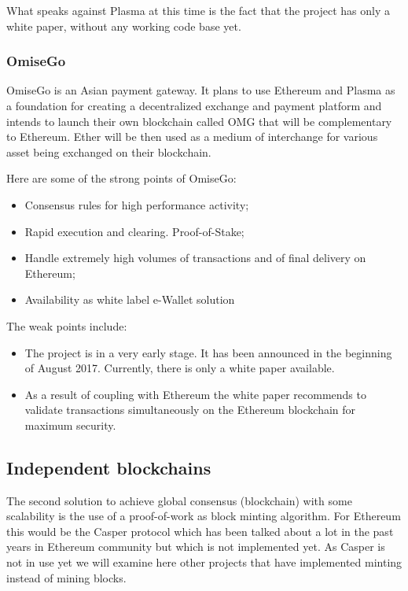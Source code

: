 What speaks against Plasma at this time is the fact that the project has only a white paper, without any working code base yet.

\subsubsection{OmiseGo}
OmiseGo is an Asian payment gateway. It plans to use Ethereum and Plasma as a foundation for creating a decentralized exchange and payment platform \cite{OMG} and intends to launch their own blockchain called OMG that will be complementary to Ethereum. Ether will be then used as a medium of interchange for various asset being exchanged on their blockchain.

Here are some of the strong points of OmiseGo:
\begin{itemize}
    \item Consensus rules for high performance activity;
    \item Rapid execution and clearing. Proof-of-Stake;
    \item Handle extremely high volumes of transactions and of final delivery on Ethereum;
    \item Availability as white label e-Wallet solution
\end{itemize}

The weak points include:

\begin{itemize}
    \item The project is in a very early stage. It has been announced in the beginning of August 2017. Currently, there is only a white paper available.
    \item As a result of coupling with Ethereum the white paper recommends to validate transactions simultaneously on the Ethereum blockchain for maximum security.
\end{itemize}

\subsection{Independent blockchains}
The second solution to achieve global consensus (blockchain) with some scalability is the use of a proof-of-work as block minting algorithm. For Ethereum this would be the Casper protocol which has been talked about a lot in the past years in Ethereum community but which is not implemented yet. As Casper is not in use yet we will examine here other projects that have implemented minting instead of mining blocks.

